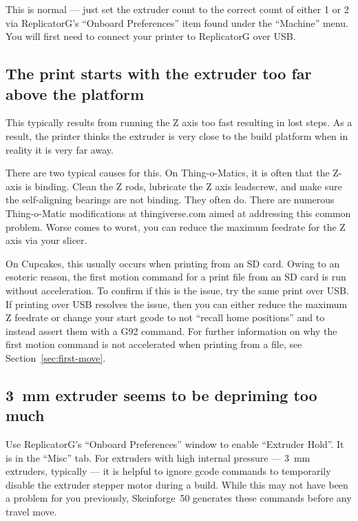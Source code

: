 This is normal --- just set the extruder count to the correct count of either 1
or 2 via ReplicatorG's ``Onboard Preferences'' item found under the ``Machine''
menu.  You will first need to connect your printer to ReplicatorG over USB.

\subsection{The print starts with the extruder too far above the platform}

This typically results from running the Z axis too fast resulting in
lost steps.  As a result, the printer thinks the extruder is very close
to the build platform when in reality it is very far away.

There are two typical causes for this.  On Thing-o-Matics, it is often that
the Z-axis is binding.  Clean the Z rods, lubricate the Z axis leadscrew, and make
sure the self-aligning bearings are not binding.  They often do.  There
are numerous Thing-o-Matic modifications at thingiverse.com aimed at
addressing this common problem.  Worse comes to worst, you can reduce
the maximum feedrate for the Z axis via your slicer.

On Cupcakes, this usually occurs when printing from an SD card.  Owing to
an esoteric reason, the first motion command for a print file from an SD
card is run without acceleration.  To confirm if this is the issue, try
the same print over USB.  If printing over USB resolves the issue, then
you can either reduce the maximum Z feedrate or change your start gcode
to not ``recall home positions'' and to instead assert them with a G92
command.  For further information on why the first motion command is
not accelerated when printing from a file, see Section~\ref{sec:first-move}.

\subsection{3~mm extruder seems to be depriming too much}

Use ReplicatorG's ``Onboard Preferences'' window to enable ``Extruder
Hold''.  It is in the ``Misc'' tab. For extruders with high internal
pressure --- 3~mm extruders, typically --- it is helpful to ignore gcode
commands to temporarily disable the extruder stepper motor during a
build.  While this may not have been a problem for you previously,
Skeinforge~50 generates these commands before any \gls{travel move}.

